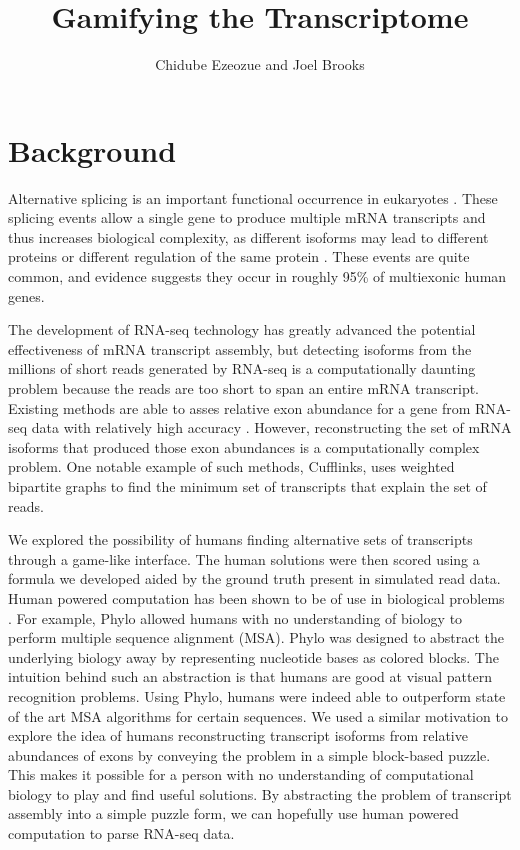 \documentclass[12pt]{article}
\title{Gamifying the Transcriptome}
\author{Chidube Ezeozue and Joel Brooks}
\begin{document}

\renewcommand\refname{Bibliography}
\maketitle

\begin{abstract}

\end{abstract}

\section{Background}
Alternative splicing is an important functional occurrence in eukaryotes \citep{pan2008deep}. These splicing events allow a single gene to produce multiple mRNA transcripts and thus increases biological complexity, as different isoforms may lead to different proteins or different regulation of the same protein \citep{trapnell2010transcript}. These events are quite common, and evidence suggests they occur in roughly 95\% of multiexonic human genes.

The development of RNA-seq technology has greatly advanced the potential effectiveness of mRNA transcript assembly, but detecting isoforms from the millions of short reads generated by RNA-seq is a computationally daunting problem because the reads are too short to span an entire mRNA transcript. Existing methods are able to asses relative exon abundance for a gene from RNA-seq data with relatively high accuracy \citep{trapnell2009tophat}. However, reconstructing the set of mRNA isoforms that produced those exon abundances is a computationally complex problem. One notable example of such methods, Cufflinks, uses weighted bipartite graphs to find the minimum set of transcripts that explain the set of reads. 

We explored the possibility of humans finding alternative sets of transcripts through a game-like interface. The human solutions were then scored using a formula we developed aided by the ground truth present in simulated read data. Human powered computation has been shown to be of use in biological problems \citep{kawrykow2012phylo, cooper2010predicting}. For example, Phylo allowed humans with no understanding of biology to perform multiple sequence alignment (MSA). Phylo was designed to abstract the underlying biology away by representing nucleotide bases as colored blocks.  The intuition behind such an abstraction is that humans are good at visual pattern recognition problems. Using Phylo, humans were indeed able to outperform state of the art MSA algorithms for certain sequences. We used a similar motivation to explore the idea of humans reconstructing transcript isoforms from relative abundances of exons by conveying the problem in a simple block-based puzzle. This makes it possible for a person with no understanding of computational biology to play and find useful solutions. By abstracting the problem of transcript assembly into a simple puzzle form, we can hopefully use human powered computation to parse RNA-seq data.
\end{document}

